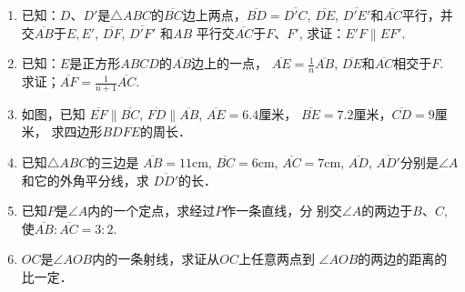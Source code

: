 \begin{enumerate}
\begin{figure}[htp]\centering
    \begin{minipage}[t]{0.48\textwidth}
    \centering
{}
    \caption*{第11题}
    \end{minipage}
    \begin{minipage}[t]{0.48\textwidth}
    \centering
    \caption*{第12题}
    \end{minipage}
    \end{figure}

\item 已知：$D$、$D'$是$\triangle ABC$的$\overline{BC}$边上两点，$\overline{BD}=\overline{D'C}$, 
$\overline{DE}$, $\overline{D'E'}$和$\overline{AC}$平行，并交$\overline{AB}$于$E,E'$, $\overline{DF}$, $\overline{D'F'}$ 和$AB$
平行交$\overline{AC}$于$F$、$F'$, 求证：$E'F\parallel EF'$.
\item 已知：$E$是正方形$ABCD$的$\overline{AB}$边上的一点，
$\overline{AE}=\frac{1}{n}\overline{AB}$, $\overline{DE}$和$\overline{AC}$相交于$F$. 求证；$\overline{AF}=\frac{1}{n+1}\overline{AC}$.
\item 如图，已知
$\overline{EF}\parallel \overline{BC}$, $\overline{FD}\parallel\overline{AB}$, $\overline{AE}=6.4$厘米，
$\overline{BE}=7.2$厘米，$\overline{CD}=9$厘米，
求四边形$BDFE$的周长．
\item 已知$\triangle ABC$的三边是
$\overline{AB}=11$cm, $\overline{BC}=6$cm,
$\overline{AC}=7$cm, $\overline{AD}$, $\overline{AD'}$分别是$\angle A$和它的外角平分线，求
$\overline{DD'}$的长．
\item 已知$P$是$\angle A$内的一个定点，求经过$P$作一条直线，分
别交$\angle A$的两边于$B$、$C$, 使$\overline{AB}:\overline{AC}=3:2$.
\item $OC$是$\angle AOB$内的一条射线，求证从$OC$上任意两点到
$\angle AOB$的两边的距离的比一定．


\end{enumerate}

